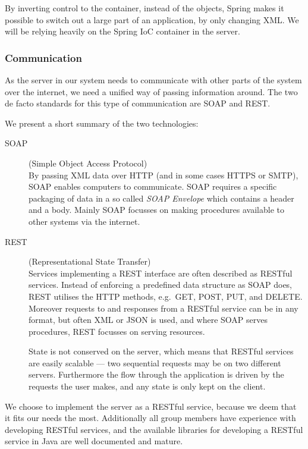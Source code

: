By inverting control to the container, instead of the objects, Spring makes it possible to switch out a large part of an application, by only changing XML.
We will be relying heavily on the Spring \ac{IoC} container in the server.

\subsubsection{Communication}
\label{subsec:tech_communication}
As the server in our system needs to communicate with other parts of the system over the internet, we need a unified way of passing information around.
The two de facto standards for this type of communication are SOAP and REST.

We present a short summary of the two technologies:
\begin{description}
    \item[SOAP] (Simple Object Access Protocol)\cite{SOAP_spec}\hfill\\
        By passing XML data over HTTP (and in some cases HTTPS or SMTP), SOAP enables computers to communicate.
        SOAP requires a specific packaging of data in a so called \textit{SOAP Envelope} which contains a header and a body.
        Mainly SOAP focusses on making procedures available to other systems via the internet.
    \item[REST] (Representational State Transfer)\cite{RESTful_best_practices}\hfill\\
        Services implementing a REST interface are often described as RESTful services.
        Instead of enforcing a predefined data structure as SOAP does, REST utilises the HTTP methods, e.g.~GET, POST, PUT, and DELETE.
        Moreover requests to and responses from a RESTful service can be in any format, but often XML or JSON is used,
        and where SOAP serves procedures, REST focusses on serving resources.

        State is not conserved on the server, which means that RESTful services are easily scalable --- two sequential requests may be on two different servers.
        Furthermore the flow through the application is driven by the requests the user makes, and any state is only kept on the client.
\end{description}

We choose to implement the server as a RESTful service, because we deem that it fits our needs the most.
Additionally all group members have experience with developing RESTful services, and the available libraries for developing a RESTful service in Java are well documented and mature.

